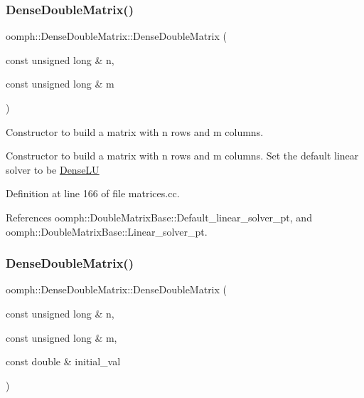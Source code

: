 \subsubsection{\texorpdfstring{Dense\+Double\+Matrix()}{DenseDoubleMatrix()}\hspace{0.1cm}{\footnotesize\ttfamily [3/5]}}
{\footnotesize\ttfamily oomph\+::\+Dense\+Double\+Matrix\+::\+Dense\+Double\+Matrix (\begin{DoxyParamCaption}\item[{const unsigned long \&}]{n,  }\item[{const unsigned long \&}]{m }\end{DoxyParamCaption})}



Constructor to build a matrix with n rows and m columns. 

Constructor to build a matrix with n rows and m columns. Set the default linear solver to be \hyperlink{classoomph_1_1DenseLU}{Dense\+LU} 

Definition at line 166 of file matrices.\+cc.



References oomph\+::\+Double\+Matrix\+Base\+::\+Default\+\_\+linear\+\_\+solver\+\_\+pt, and oomph\+::\+Double\+Matrix\+Base\+::\+Linear\+\_\+solver\+\_\+pt.

\mbox{\label{classoomph_1_1DenseDoubleMatrix_a8b964715b2e8fa266d3676fc965296b0}} 
\subsubsection{\texorpdfstring{Dense\+Double\+Matrix()}{DenseDoubleMatrix()}\hspace{0.1cm}{\footnotesize\ttfamily [4/5]}}
{\footnotesize\ttfamily oomph\+::\+Dense\+Double\+Matrix\+::\+Dense\+Double\+Matrix (\begin{DoxyParamCaption}\item[{const unsigned long \&}]{n,  }\item[{const unsigned long \&}]{m,  }\item[{const double \&}]{initial\+\_\+val }\end{DoxyParamCaption})}



